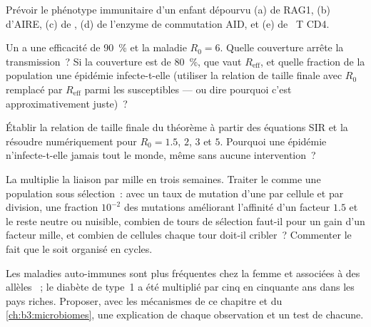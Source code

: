 \begin{exercise}[$\star\star$]\label{exo:b3:adaptive-immunity:8}
Prévoir le phénotype immunitaire d'un enfant dépourvu (a) de RAG1, (b)
d'AIRE, (c) de , (d) de l'enzyme de commutation AID, et (e) de
~T CD4.
\end{exercise}

\begin{exercise}[$\star\star$]\label{exo:b3:adaptive-immunity:9}
Un  a une efficacité de \qty{90}{\%} et la maladie $R_{0} = 6$.
Quelle couverture arrête la transmission~? Si la couverture est de
\qty{80}{\%}, que vaut $R_{\text{eff}}$, et quelle fraction de la
population une épidémie infecte-t-elle (utiliser la relation de taille
finale avec $R_{0}$ remplacé par $R_{\text{eff}}$ parmi les
susceptibles --- ou dire pourquoi c'est approximativement juste)~?
\end{exercise}

\begin{exercise}[$\star\star\star$]\label{exo:b3:adaptive-immunity:10}
Établir la relation de taille finale du théorème à partir des équations
SIR et la résoudre numériquement pour $R_{0} = 1.5$, $2$, $3$ et $5$.
Pourquoi une épidémie n'infecte-t-elle jamais tout le monde, même sans
aucune intervention~?
\end{exercise}

\begin{exercise}[$\star\star\star$]\label{exo:b3:adaptive-immunity:11}
La  multiplie la liaison par mille en trois
semaines. Traiter le  comme une population sous
sélection~: avec un taux de mutation d'une par cellule et par division,
une fraction $10^{-2}$ des mutations améliorant l'affinité d'un facteur
$1.5$ et le reste neutre ou nuisible, combien de tours de sélection
faut-il pour un gain d'un facteur mille, et combien de cellules chaque
tour doit-il cribler~? Commenter le fait que le  soit
organisé en cycles.
\end{exercise}

\begin{exercise}[$\star\star\star$]\label{exo:b3:adaptive-immunity:12}
Les maladies auto-immunes sont plus fréquentes chez la femme et
associées à des allèles ~; le diabète de type~1 a été multiplié par
cinq en cinquante ans dans les pays riches. Proposer, avec les
mécanismes de ce chapitre et du \cref{ch:b3:microbiomes}, une
explication de chaque observation et un test de chacune.
\end{exercise}

